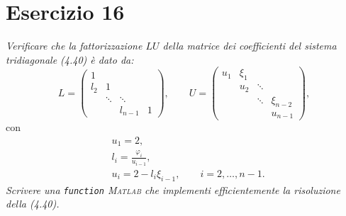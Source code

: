 \section{Esercizio 16}
\label{sub:Esercizio 16}
\emph{Verificare che la fattorizzazione $LU$ della matrice dei coefficienti del sistema tridiagonale (4.40) è dato da:}
			\[
				L=
				\begin{pmatrix}
					1 & & &\\
					l_2 & 1 & &\\
					& \ddots & \ddots &\\
					& & l_{n-1} & 1
				\end{pmatrix},
				\qquad U=
				\begin{pmatrix}
					u_1 & \xi_1 & &\\
					& u_2 & \ddots &\\
					& & \ddots & \xi_{n-2}\\
					& & & u_{n-1}
				\end{pmatrix},
			\]
			con
			\begin{align*}
				&u_1=2,\\
				&l_i=\frac{\varphi_i}{u_{i-1}},\\
				&u_i=2-l_i\xi_{i-1},\qquad i=2,\dots,n-1.
			\end{align*}
\emph{Scrivere una \lstinline{function} \textsc{Matlab} che implementi efficientemente la risoluzione della (4.40).}
